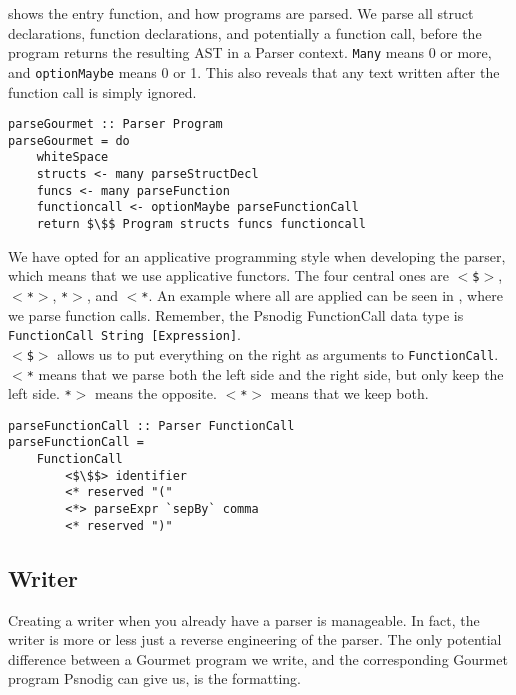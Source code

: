 shows the entry function, and how programs are parsed. We parse all struct declarations, function declarations, and potentially a function call, before the program returns the resulting AST in a Parser context. \texttt{Many} means 0 or more, and \texttt{optionMaybe} means 0 or 1. This also reveals that any text written after the function call is simply ignored. \\

\begin{lstlisting}[caption={Parsing Gourmet programs.}, captionpos=b, label={parsingGourmet}]
parseGourmet :: Parser Program
parseGourmet = do
    whiteSpace
    structs <- many parseStructDecl
    funcs <- many parseFunction
    functioncall <- optionMaybe parseFunctionCall
    return $\$$ Program structs funcs functioncall
\end{lstlisting}

We have opted for an applicative programming style when developing the parser, which means that we use applicative functors. The four central ones are \texttt{$<$\$$>$}, \texttt{$<$*$>$}, \texttt{*$>$}, and \texttt{$<$*}. An example where all are applied can be seen in , where we parse function calls. Remember, the Psnodig FunctionCall data type is \texttt{FunctionCall String [Expression]}. \\

\texttt{$<$\$$>$} allows us to put everything on the right as arguments to \texttt{FunctionCall}. \texttt{$<$*} means that we parse both the left side and the right side, but only keep the left side. \texttt{*$>$} means the opposite. \texttt{$<$*$>$} means that we keep both. \\

\begin{lstlisting}[caption={Parsing Gourmet function calls.}, captionpos=b, label={Parsing Gourmet function calls.}]
parseFunctionCall :: Parser FunctionCall
parseFunctionCall =
    FunctionCall
        <$\$$> identifier
        <* reserved "("
        <*> parseExpr `sepBy` comma
        <* reserved ")"
\end{lstlisting}

\subsection{Writer}

Creating a writer when you already have a parser is manageable. In fact, the writer is more or less just a reverse engineering of the parser. The only potential difference between a Gourmet program we write, and the corresponding Gourmet program Psnodig can give us, is the formatting. \\

